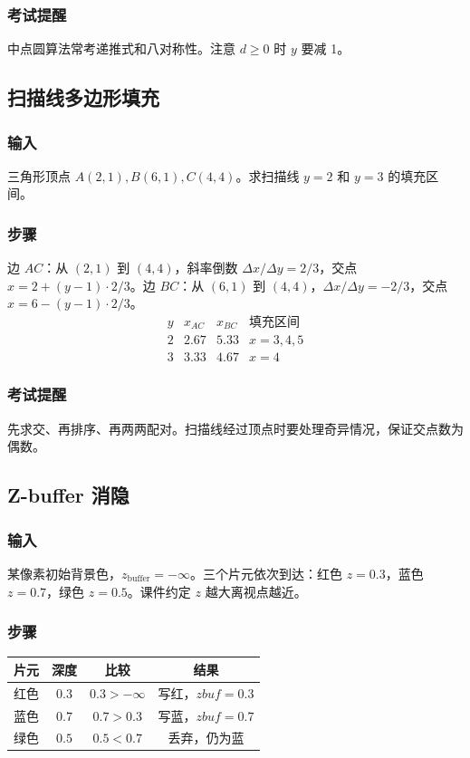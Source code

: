 \documentclass[UTF8,fontset=fandol,11pt]{ctexart}
\newcommand{\key}[1]{\textbf{#1}}
\begin{document}
\subsubsection*{考试提醒}
中点圆算法常考递推式和八对称性。注意 $d\ge0$ 时 $y$ 要减 1。

\subsection{扫描线多边形填充}
\subsubsection*{输入}
三角形顶点 $A(2,1),B(6,1),C(4,4)$。求扫描线 $y=2$ 和 $y=3$ 的填充区间。
\subsubsection*{步骤}
边 $AC$：从 $(2,1)$ 到 $(4,4)$，斜率倒数 $\Delta x/\Delta y=2/3$，交点 $x=2+(y-1)\cdot2/3$。边 $BC$：从 $(6,1)$ 到 $(4,4)$，$\Delta x/\Delta y=-2/3$，交点 $x=6-(y-1)\cdot2/3$。
\[
\begin{array}{c|c|c|c}
y & x_{AC} & x_{BC} & \text{填充区间}\\
\hline
2&2.67&5.33&x=3,4,5\\
3&3.33&4.67&x=4
\end{array}
\]
\subsubsection*{考试提醒}
先求交、再排序、再两两配对。扫描线经过顶点时要处理奇异情况，保证交点数为偶数。

\subsection{Z-buffer 消隐}
\subsubsection*{输入}
某像素初始背景色，$z_{\text{buffer}}=-\infty$。三个片元依次到达：红色 $z=0.3$，蓝色 $z=0.7$，绿色 $z=0.5$。课件约定 $z$ 越大离视点越近。
\subsubsection*{步骤}
\begin{center}
\begin{tabular}{c|c|c|c}
\key{片元} & \key{深度} & \key{比较} & \key{结果}\\
\hline
红色 & $0.3$ & $0.3>-\infty$ & 写红，$zbuf=0.3$\\
蓝色 & $0.7$ & $0.7>0.3$ & 写蓝，$zbuf=0.7$\\
绿色 & $0.5$ & $0.5<0.7$ & 丢弃，仍为蓝\\
\end{tabular}
\end{center}
\end{document}
